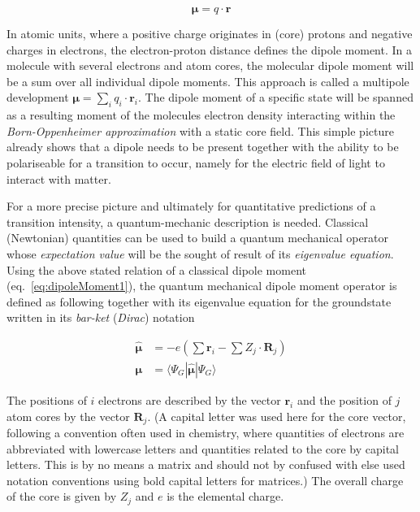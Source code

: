 			\begin{equation}
				\label{eq:dipoleMoment1}
				\bm{\mu} = q\cdot \bm{r}
			\end{equation}

			In atomic units, where a positive charge originates in (core) protons and negative charges in electrons, the electron-proton distance defines the dipole moment. In a molecule with several electrons and atom cores, the molecular dipole moment will be a sum over all individual dipole moments. This approach is called a multipole development $\bm{\mu} = \sum_i q_i\cdot \bm{r}_i$. The dipole moment of a specific state will be spanned as a resulting moment of the molecules electron density interacting within the \emph{Born-Oppenheimer approximation} with a static core field. This simple picture already shows that a dipole needs to be present together with the ability to be polariseable for a transition to occur, namely for the electric field of light to interact with matter.

			For a more precise picture and ultimately for quantitative predictions of a transition intensity, a quantum-mechanic description is needed. Classical (Newtonian) quantities can be used to build a quantum mechanical operator whose \emph{expectation value} will be the sought of result of its \emph{eigenvalue equation}. Using the above stated relation of a classical dipole moment (eq.~\ref{eq:dipoleMoment1}), the quantum mechanical dipole moment operator is defined as following together with its eigenvalue equation for the groundstate written in its \emph{bar-ket} (\emph{Dirac}) notation

			\begin{equation}
				\begin{split}
				\label{eq:dipoleMoment2}
				\bm{\hat{\mu}} &= -e\left(\sum\bm{r}_i-\sum Z_j\cdot\bm{R}_j\right) \\
				\bm{\mu} &= \langle \Psi_G | \bm{\hat{\mu}} | \Psi_G \rangle
				\end{split}
			\end{equation}
			
			The positions of $i$ electrons are described by the vector $\bm{r}_i$ and the position of $j$ atom cores by the vector $\bm{R}_j$. (A capital letter was used here for the core vector, following a convention often used in chemistry, where quantities of electrons are abbreviated with lowercase letters and quantities related to the core by capital letters. This is by no means a matrix and should not by confused with else used notation conventions using bold capital letters for matrices.) The overall charge of the core is given by $Z_j$ and $e$ is the elemental charge. 

